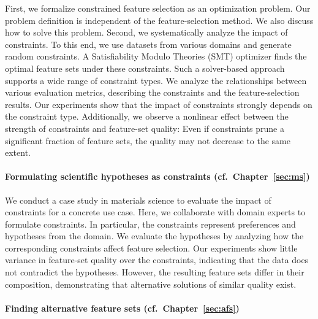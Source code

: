 First, we formalize constrained feature selection as an optimization problem.
Our problem definition is independent of the feature-selection method.
We also discuss how to solve this problem.
Second, we systematically analyze the impact of constraints.
To this end, we use datasets from various domains and generate random constraints.
A Satisfiability Modulo Theories (SMT) optimizer finds the optimal feature sets under these constraints.
Such a solver-based approach supports a wide range of constraint types.
We analyze the relationships between various evaluation metrics, describing the constraints and the feature-selection results.
Our experiments show that the impact of constraints strongly depends on the constraint type.
Additionally, we observe a nonlinear effect between the strength of constraints and feature-set quality:
Even if constraints prune a significant fraction of feature sets, the quality may not decrease to the same extent.

\paragraph{Formulating scientific hypotheses as constraints (cf.~Chapter~\ref{sec:ms})}

We conduct a case study in materials science to evaluate the impact of constraints for a concrete use case.
Here, we collaborate with domain experts to formulate constraints.
In particular, the constraints represent preferences and hypotheses from the domain.
We evaluate the hypotheses by analyzing how the corresponding constraints affect feature selection.
Our experiments show little variance in feature-set quality over the constraints, indicating that the data does not contradict the hypotheses.
However, the resulting feature sets differ in their composition, demonstrating that alternative solutions of similar quality exist.

\paragraph{Finding alternative feature sets (cf.~Chapter~\ref{sec:afs})}

